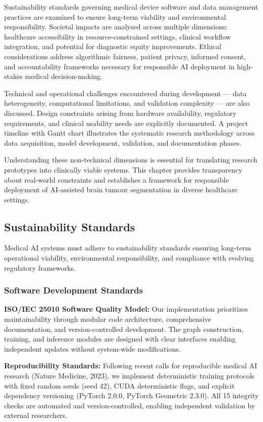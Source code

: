 \documentclass{article}
\begin{document}
Sustainability standards governing medical device software and data management practices are examined to ensure long-term viability and environmental responsibility. Societal impacts are analysed across multiple dimensions: healthcare accessibility in resource-constrained settings, clinical workflow integration, and potential for diagnostic equity improvements. Ethical considerations address algorithmic fairness, patient privacy, informed consent, and accountability frameworks necessary for responsible AI deployment in high-stakes medical decision-making.

Technical and operational challenges encountered during development — data heterogeneity, computational limitations, and validation complexity — are also discussed. Design constraints arising from hardware availability, regulatory requirements, and clinical usability needs are explicitly documented. A project timeline with Gantt chart illustrates the systematic research methodology across data acquisition, model development, validation, and documentation phases.

Understanding these non-technical dimensions is essential for translating research prototypes into clinically viable systems. This chapter provides transparency about real-world constraints and establishes a framework for responsible deployment of AI-assisted brain tumour segmentation in diverse healthcare settings.


\subsection{Sustainability Standards}

Medical AI systems must adhere to sustainability standards ensuring long-term operational viability, environmental responsibility, and compliance with evolving regulatory frameworks.

\subsubsection{Software Development Standards}

\textbf{ISO/IEC 25010 Software Quality Model:} Our implementation prioritizes maintainability through modular code architecture, comprehensive documentation, and version-controlled development. The graph construction, training, and inference modules are designed with clear interfaces enabling independent updates without system-wide modifications.

\textbf{Reproducibility Standards:} Following recent calls for reproducible medical AI research (Nature Medicine, 2023), we implement deterministic training protocols with fixed random seeds (seed 42), CUDA deterministic flags, and explicit dependency versioning (PyTorch 2.0.0, PyTorch Geometric 2.3.0). All 15 integrity checks are automated and version-controlled, enabling independent validation by external researchers.
\end{document}
